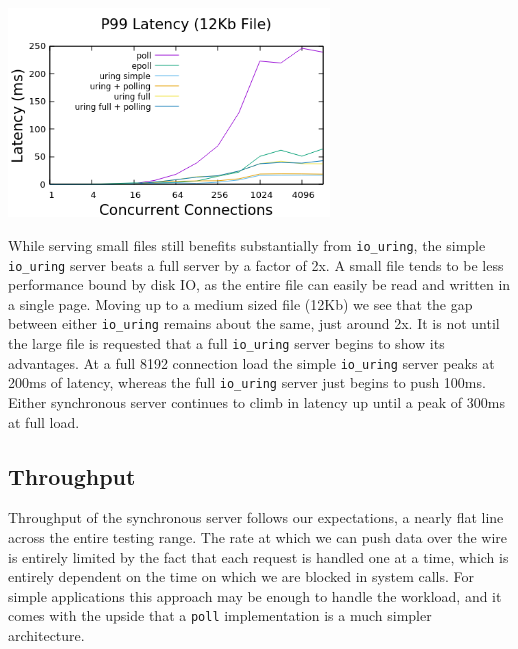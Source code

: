 \documentclass[letterpaper, 10pt, twocolumn]{article}
\begin{document}
\begin{center}
\includegraphics[width=3.35in]{./med_latency.png}
\end{center}

While serving small files still benefits substantially from \texttt{io\_uring}, the simple \texttt{io\_uring} server beats a full server by a factor of 2x. A small file tends to be less performance bound by disk IO, as the entire file can easily be read and written in a single page. Moving up to a medium sized file (12Kb) we see that the gap between either \texttt{io\_uring} remains about the same, just around 2x. It is not until the large file is requested that a full \texttt{io\_uring} server begins to show its advantages. At a full 8192 connection load the simple \texttt{io\_uring} server peaks at 200ms of latency, whereas the full \texttt{io\_uring} server just begins to push 100ms. Either synchronous server continues to climb in latency up until a peak of 300ms at full load.

\subsection{Throughput}
\label{sec:orgfdc5879}
Throughput of the synchronous server follows our expectations, a nearly flat line across the entire testing range. The rate at which we can push data over the wire is entirely limited by the fact that each request is handled one at a time, which is entirely dependent on the time on which we are blocked in system calls. For simple applications this approach may be enough to handle the workload, and it comes with the upside that a \texttt{poll} implementation is a much simpler architecture.
\end{document}
